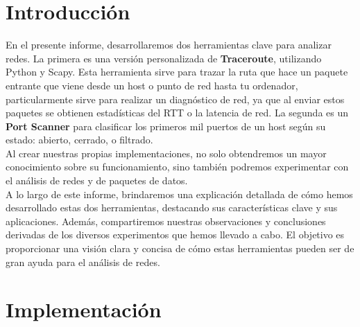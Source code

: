 \documentclass{article}
\begin{document}
\section{Introducción}
    \vspace{0.5cm}
    En el presente informe, desarrollaremos dos herramientas clave para analizar redes. La primera es una versión personalizada de \textbf{Traceroute}, utilizando Python y Scapy. Esta herramienta sirve para trazar la ruta que hace un paquete entrante que viene desde un host o punto de red hasta tu ordenador, particularmente sirve para realizar un diagnóstico de red, ya que al enviar estos paquetes se obtienen estadísticas del RTT o la latencia de red. La segunda es un \textbf{Port Scanner} para clasificar los primeros mil puertos de un host según su estado: abierto, cerrado, o filtrado. \\
    Al crear nuestras propias implementaciones, no solo obtendremos un mayor conocimiento sobre su funcionamiento, sino también podremos experimentar con el análisis de redes y de paquetes de datos.\\
    A lo largo de este informe, brindaremos una explicación detallada de cómo hemos desarrollado estas dos herramientas, destacando sus características clave y sus aplicaciones. Además, compartiremos nuestras observaciones y conclusiones derivadas de los diversos experimentos que hemos llevado a cabo. El objetivo es proporcionar una visión clara y concisa de cómo estas herramientas pueden ser de gran ayuda para el análisis de redes. \\

\section{Implementación}
    \vspace{0.5cm}
\end{document}

